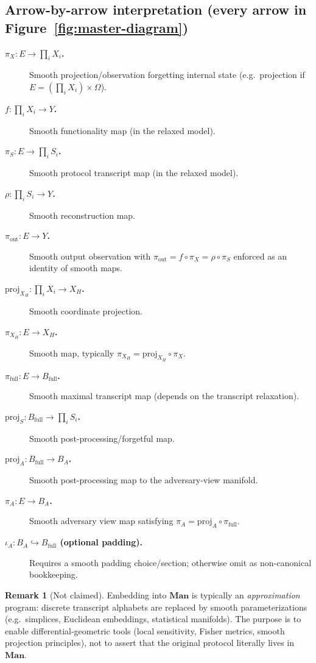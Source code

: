\documentclass[11pt,a4paper]{article}
\theoremstyle{definition}
\newtheorem{remark}[definition]{Remark}
\theoremstyle{plain}
\begin{document}
\subsection{Arrow-by-arrow interpretation (every arrow in Figure~\ref{fig:master-diagram})}
\begin{description}
    \item[\textbf{$\pi_X:E\to \prod_i X_i$.}] Smooth projection/observation forgetting internal state (e.g.\ projection if $E=(\prod_i X_i)\times\Omega$).
    \item[\textbf{$f:\prod_i X_i\to Y$.}] Smooth functionality map (in the relaxed model).
    \item[\textbf{$\pi_S:E\to \prod_i S_i$.}] Smooth protocol transcript map (in the relaxed model).
    \item[\textbf{$\rho:\prod_i S_i\to Y$.}] Smooth reconstruction map.
    \item[\textbf{$\pi_{\mathrm{out}}:E\to Y$.}] Smooth output observation with $\pi_{\mathrm{out}}=f\circ\pi_X=\rho\circ\pi_S$ enforced as an identity of smooth maps.
    \item[\textbf{$\mathrm{proj}_{X_H}:\prod_i X_i\to X_H$.}] Smooth coordinate projection.
    \item[\textbf{$\pi_{X_H}:E\to X_H$.}] Smooth map, typically $\pi_{X_H}=\mathrm{proj}_{X_H}\circ \pi_X$.
    \item[\textbf{$\pi_{\mathrm{full}}:E\to B_{\mathrm{full}}$.}] Smooth maximal transcript map (depends on the transcript relaxation).
    \item[\textbf{$\mathrm{proj}_S:B_{\mathrm{full}}\to \prod_i S_i$.}] Smooth post-processing/forgetful map.
    \item[\textbf{$\mathrm{proj}_A:B_{\mathrm{full}}\to B_A$.}] Smooth post-processing map to the adversary-view manifold.
    \item[\textbf{$\pi_A:E\to B_A$.}] Smooth adversary view map satisfying $\pi_A=\mathrm{proj}_A\circ \pi_{\mathrm{full}}$.
    \item[\textbf{$\iota_A:B_A\hookrightarrow B_{\mathrm{full}}$ (optional padding).}] Requires a smooth padding choice/section; otherwise omit as non-canonical bookkeeping.
\end{description}

\begin{remark}[Not claimed]
Embedding into $\mathbf{Man}$ is typically an \emph{approximation} program: discrete transcript alphabets are replaced by smooth parameterizations (e.g.\ simplices, Euclidean embeddings, statistical manifolds). The purpose is to enable differential-geometric tools (local sensitivity, Fisher metrics, smooth projection principles), not to assert that the original protocol literally lives in $\mathbf{Man}$.
\end{remark}



\end{document}
